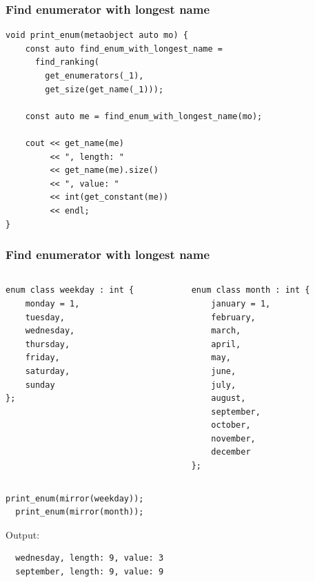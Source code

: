 \documentclass[compress,table,xcolor=table]{beamer}
\begin{document}
\begin{frame}[fragile]
  \frametitle{Find enumerator with longest name}
  \begin{lstlisting}[language=c++2x,basicstyle=\footnotesize\ttfamily]
void print_enum(metaobject auto mo) {
    const auto find_enum_with_longest_name =
      find_ranking(
        get_enumerators(_1),
        get_size(get_name(_1)));

    const auto me = find_enum_with_longest_name(mo);

    cout << get_name(me)
         << ", length: "
         << get_name(me).size()
         << ", value: "
         << int(get_constant(me))
         << endl;
}
  \end{lstlisting}
\end{frame}
\begin{frame}[fragile]
  \frametitle{Find enumerator with longest name}
  \begin{columns}
    \begin{column}{.45\textwidth}
      \begin{lstlisting}[language=c++2x,basicstyle=\scriptsize\ttfamily]
enum class weekday : int {
    monday = 1,
    tuesday,
    wednesday,
    thursday,
    friday,
    saturday,
    sunday
};
      \end{lstlisting}
    \end{column}
    \begin{column}{.45\textwidth}
      \begin{lstlisting}[language=c++2x,basicstyle=\tiny\ttfamily]
enum class month : int {
    january = 1,
    february,
    march,
    april,
    may,
    june,
    july,
    august,
    september,
    october,
    november,
    december
};
      \end{lstlisting}
    \end{column}
  \end{columns}
  \begin{lstlisting}[language=c++2x]
  print_enum(mirror(weekday));
  print_enum(mirror(month));
  \end{lstlisting}
  Output:
  \begin{verbatim}
  wednesday, length: 9, value: 3
  september, length: 9, value: 9
  \end{verbatim}
\end{frame}
\end{document}
